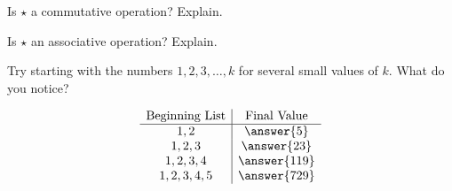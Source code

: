 \documentclass{ximera}
\begin{document}
\begin{problem}
Is $\star$ a commutative operation?  Explain.  
\begin{freeResponse}
\end{freeResponse}
\end{problem}


\begin{problem}
Is $\star$ an associative operation?  Explain.  
\begin{freeResponse}
\end{freeResponse}
\end{problem}

\begin{problem}
Try starting with the numbers $1,2,3,\dots, k$ for several small values of $k$.  What do you notice?  

\[
\begin{array}{c|c}
\text{Beginning List}& \text{Final Value} \\
\hline
1,  2 & \answer{5}  \\
1,  2,  3 & \answer{23} \\  
1,  2,  3, 4 & \answer{119} \\
1,  2,  3, 4, 5 & \answer{729}
\end{array}
\]

\end{problem}
\end{document}
